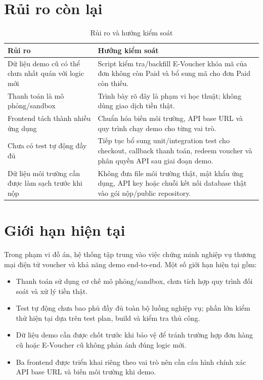 \section{Rủi ro còn lại}

\begin{table}[H]
\centering
\begin{tabularx}{\textwidth}{|p{4.0cm}|Y|}
\hline
\textbf{Rủi ro} & \textbf{Hướng kiểm soát} \\ \hline
Dữ liệu demo cũ có thể chưa nhất quán với logic mới & Script kiểm tra/backfill E-Voucher khóa mã của đơn không còn Paid và bổ sung mã cho đơn Paid còn thiếu. \\ \hline
Thanh toán là mô phỏng/sandbox & Trình bày rõ đây là phạm vi học thuật; không dùng giao dịch tiền thật. \\ \hline
Frontend tách thành nhiều ứng dụng & Chuẩn hóa biến môi trường, API base URL và quy trình chạy demo cho từng vai trò. \\ \hline
Chưa có test tự động đầy đủ & Tiếp tục bổ sung unit/integration test cho checkout, callback thanh toán, redeem voucher và phân quyền API sau giai đoạn demo. \\ \hline
Dữ liệu môi trường cần được làm sạch trước khi nộp & Không đưa file môi trường thật, mật khẩu ứng dụng, API key hoặc chuỗi kết nối database thật vào gói nộp/public repository. \\ \hline
\end{tabularx}
\caption{Rủi ro và hướng kiểm soát}
\end{table}

\section{Giới hạn hiện tại}

Trong phạm vi đồ án, hệ thống tập trung vào việc chứng minh nghiệp vụ thương mại điện tử voucher và khả năng demo end-to-end. Một số giới hạn hiện tại gồm:

\begin{itemize}[leftmargin=1.2cm]
    \item Thanh toán sử dụng cơ chế mô phỏng/sandbox, chưa tích hợp quy trình đối soát và xử lý tiền thật.
    \item Test tự động chưa bao phủ đầy đủ toàn bộ luồng nghiệp vụ; phần lớn kiểm thử hiện tại dựa trên test plan, build và kiểm tra thủ công.
    \item Dữ liệu demo cần được chốt trước khi bảo vệ để tránh trường hợp đơn hàng cũ hoặc E-Voucher cũ không phản ánh đúng logic mới.
    \item Ba frontend được triển khai riêng theo vai trò nên cần cấu hình chính xác API base URL và biến môi trường khi demo.
\end{itemize}
